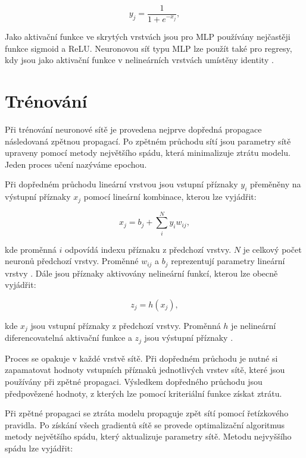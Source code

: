 \documentclass[FM,BP]{tulthesis}
\begin{document}
\begin{equation}
\label{eqn:sigmoid}
y_j =  \frac{\mathrm{1} }{\mathrm{1} + e^{-x_j} },
\end{equation}

Jako aktivační funkce ve skrytých vrstvách jsou pro MLP používány nejčastěji funkce sigmoid a ReLU. Neuronovou síť typu MLP lze použít také pro regresy, kdy jsou jako aktivační funkce v nelineárních vrstvách umístěny identity \cite{DBLP:books/lib/Bishop07}.

\section{Trénování} %
Při trénování neuronové sítě je provedena nejprve dopředná propagace následovaná zpětnou propagací. Po zpětném průchodu sítí jsou parametry sítě upraveny pomocí metody největšího spádu, která minimalizuje ztrátu modelu. Jeden proces učení nazýváme epochou.

Při dopředném průchodu lineární vrstvou jsou vstupní příznaky $ y_i $ přeměněny na výstupní příznaky $ x_j $ pomocí lineární kombinace, kterou lze vyjádřit:

\begin{equation}
\label{eqn:linear_layer}
x_j = b_j + \sum_{i}^{N} y_i w_{ij},
\end{equation}

kde proměnná $ i $ odpovídá indexu příznaku z předchozí vrstvy. $ N $ je celkový počet neuronů předchozí vrstvy. Proměnné $ w_{ij} $ a $ b_j $ reprezentují parametry lineární vrstvy \cite{MATEJU2021327}. Dále jsou příznaky aktivovány nelineární funkcí, kterou lze obecně vyjádřit:

\begin{equation}
\label{eqn:activation}
z_j = h(x_j),
\end{equation}

kde $ x_j $ jsou vstupní příznaky z předchozí vrstvy. Proměnná $ h $ je nelineární diferencovatelná aktivační funkce a $ z_j $ jsou výstupní příznaky \cite{DBLP:books/lib/Bishop07}.

Proces se opakuje v každé vrstvě sítě. Při dopředném průchodu je nutné si zapamatovat hodnoty vstupních příznaků jednotlivých vrstev sítě, které jsou používány při zpětné propagaci. Výsledkem dopředného průchodu jsou předpovězené hodnoty, z kterých lze pomocí kriteriální funkce získat ztrátu.

Při zpětné propagaci se ztráta modelu propaguje zpět sítí pomocí řetízkového pravidla. Po získání všech gradientů sítě se provede optimalizační algoritmus metody největšího spádu, který aktualizuje parametry sítě. Metodu nejvyššího spádu lze vyjádřit:
\end{document}
